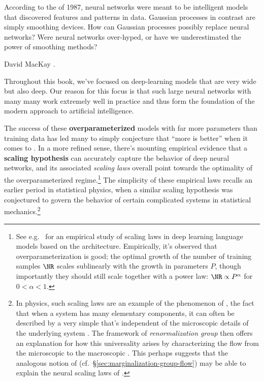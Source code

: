 \label{epi:overparameterization}
\epigraph{According to the  of 1987, neural networks were meant to be intelligent models that discovered features and patterns in data. Gaussian processes in contrast are simply smoothing devices. How can Gaussian processes possibly replace neural networks? Were neural networks over-hyped, or have we underestimated the power of smoothing methods?}{David MacKay \cite{mackay2003information}.}



\noindent{}Throughout this book, we've focused on deep-learning models that are very wide but also deep. Our reason for this focus is that such large neural networks with many many  work extremely well in practice and thus form 
the 
foundation
of the modern approach to artificial intelligence. 


The success of these \textbf{overparameterized} models with far more parameters than training data has led many to simply conjecture that ``more is better'' when it comes to .
In a 
more refined sense, there's mounting empirical evidence that a \textbf{scaling hypothesis} can accurately capture the behavior of deep neural networks, and its associated \emph{scaling laws} overall point towards the optimality of the overparameterized regime.\footnote{
    See e.g.~\cite{kaplan2020scaling} for an empirical study of scaling laws in deep learning language models based on the  architecture. Empirically, it's observed that overparameterization is good; the optimal growth of the number of training samples $\NR$  scales sublinearly with the growth in parameters $P$, though importantly they should still scale together with a power law: $\NR \propto P^\alpha$ for $0 <\alpha < 1$. 
}
The simplicity of these empirical laws recalls an earlier period in statistical physics, when
a similar scaling hypothesis was
conjectured
to govern the behavior of certain complicated systems
in statistical mechanics.\footnote{
    In physics, such scaling laws are an example of the phenomenon of , the fact that when a system has many elementary components, it can often be described by a very simple  that's independent of the microscopic details of the underlying system \cite{Kadanoff:1971pc}. The framework of \emph{renormalization group} then offers an explanation for how this universality arises by characterizing the flow from the microscopic to the macroscopic \cite{PhysRevB.4.3174,PhysRevB.4.3184}. This perhaps suggests that
    the 
    analogous
    notion of  (cf.~\S\ref{sec:marginalization-group-flow})
    may be able
    to explain the neural scaling laws of \cite{kaplan2020scaling}.
}




